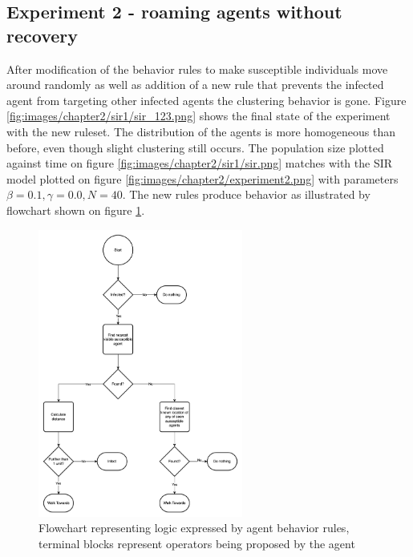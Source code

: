\subsection{Experiment 2 - roaming agents without recovery}

After modification of the behavior rules to make susceptible individuals move around randomly as well as addition of a new rule that prevents the infected agent from targeting other infected agents the clustering behavior is gone.
Figure \ref{fig:images/chapter2/sir1/sir_123.png} shows the final state of the experiment with the new ruleset.
The distribution of the agents is more homogeneous than before, even though slight clustering still occurs.
The population size plotted against time on figure \ref{fig:images/chapter2/sir1/sir.png} matches with the SIR model plotted on figure \ref{fig:images/chapter2/experiment2.png} with parameters $\beta = 0.1, \gamma = 0.0, N = 40$.
The new rules produce behavior as illustrated by flowchart shown on figure \ref{fig:sir_logic2.drawio.png}.

\begin{figure}[H]
    \centering
    \includegraphics[width=0.6\textwidth]{images/chapter2/sir_logic2.drawio.png}
    \caption{Flowchart representing logic expressed by agent behavior rules, terminal blocks represent operators being proposed by the agent}\label{fig:sir_logic2.drawio.png}
\end{figure}


